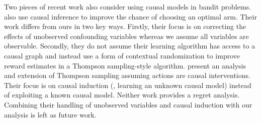 
Two pieces of recent work also consider using causal models in bandit problems.
\citet{Bareinboim2015} also use causal inference to improve the chance of choosing an optimal arm. Their work differs from ours in two key ways. Firstly, their focus is on correcting the effects of unobserved confounding variables whereas we assume all variables are observable. Secondly, they do not assume their learning algorithm has access to a causal graph and instead use a form of contextual randomization to improve reward estimates in a Thompson sampling-style algorithm. \citet{Ortega2014thompson} present an analysis and extension of Thompson sampling assuming actions are causal interventions. Their focus is on causal induction (\ie, learning an unknown causal model) instead of exploiting a known causal model. Neither work provides a regret analysis. 
Combining their handling of unobserved variables and causal induction with our analysis is left as future work.


